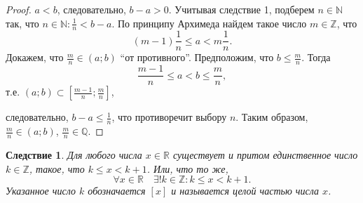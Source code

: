 \documentclass[a4paper,12pt]{article} %
\newtheorem{corollary}{Следствие}[theorem]
\theoremstyle{remark}
\theoremstyle{definition}
\begin{document}
\begin{proof}
    $a < b$, следовательно, $b - a > 0$. Учитывая следствие 1, подберем $n\in \mathbb{N}$ так, что $\displaystyle n\in \mathbb{N} : \frac{1}{n} < b-a$.
    По принципу Архимеда найдем такое число $m\in \mathbb{Z}$, что 
    \[(m-1)\frac{1}{n} \le a < m\frac{1}{n}.\]
    Докажем, что $\displaystyle \frac{m}{n} \in (a; b)$ ``от противного''. Предположим, что $\displaystyle b \le \frac{m}{n}$.
    Тогда
    \[\frac{m-1}{n} \le a < b \le \frac{m}{n},\]
    т.е. $\displaystyle (a; b) \subset \left[\frac{m-1}{n}; \frac{m}{n}\right]$,

	\begin{center}
	\end{center}
    следовательно, $\displaystyle b-a \le \frac{1}{n}$, что противоречит выбору $n$.
    Таким образом, $\displaystyle \frac{m}{n} \in (a; b)$, $\displaystyle \frac{m}{n}\in \mathbb{Q}$.

\end{proof}
\begin{corollary}
    Для любого числа $x \in \mathbb{R}$ существует и притом единственное число $k \in \mathbb{Z}$,
    такое, что $k \le x < k + 1$. Или, что то же,
    \[\forall x \in \mathbb{R} \quad \exists ! k \in \mathbb{Z} : k \le  x < k + 1.\] 
    Указанное число $k$ обозначается $[x]$ и называется целой частью числа $x$.
\end{corollary}


\newpage
\end{document}
